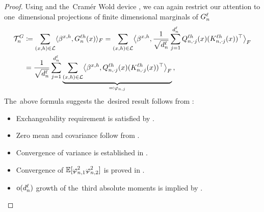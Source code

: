 \begin{proof}
    Using  and the~Cram{\' e}r Wold device \citep[p.~383]{billingsey86}, we can again restrict our attention to one~dimensional projections of finite dimensional marginals of $G_{n}^{\ell}$
    \begin{align*}
        \mathcal{T}_{n}^{G}
        &\coloneqq
        \sum_{(x, h) \in \mathcal{L}}
            \langle
                \beta^{x, h} ,
                G_{n}^{\ell h}(x)
            \rangle_F
        =
        \sum_{(x, h) \in \mathcal{L}}
            \bigl\langle
                \beta^{x, h} ,
                \frac{1}{\sqrt{d_{n}^{\ell}}}
                \sum_{j = 1}^{d_{n}^{\ell}}
                    Q_{n, \cdot j}^{\ell h}(x)
                    (K_{n, \cdot j}^{\ell h}(x))^\top
            \bigr\rangle_F
        \\
        &=
        \frac{1}{\sqrt{d_{n}^{\ell}}}
        \sum_{j = 1}^{d_{n}^{\ell}}
        \underbrace{
            \sum_{(x, h) \in \mathcal{L}}
                \bigl\langle
                    \beta^{x, h} ,
                    Q_{n, \cdot j}^{\ell h}(x)
                    (K_{n, \cdot j}^{\ell h}(x))^\top
                \bigr\rangle_F
        }_{\eqqcolon \varphi_{n, j}}
        \, ,
    \end{align*}
    The~above formula suggests the~desired result follows from :
    \begin{itemize}
        \item Exchangeability requirement is satisfied by .
        \item Zero mean and covariance follow from .
        \item Convergence of variance is established in .
        \item Convergence of $\operatorname*{\mathbb{E}} \lbrack \varphi_{n , 1}^2 \varphi_{n , 2}^2 \rbrack$ is proved in .
        \item $\mathrm{o}(d_{n}^{\ell})$ growth of the~third absolute moments is implied by .
        \qedhere
    \end{itemize}
\end{proof}

